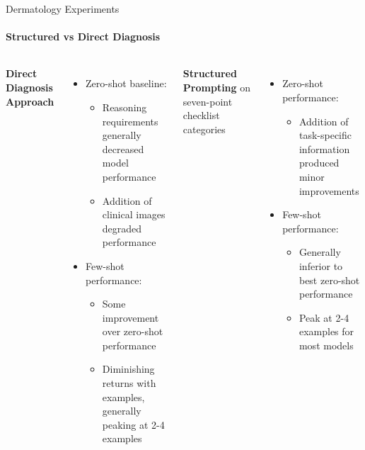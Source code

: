 \begin{frame}{Dermatology Experiments}
\framesubtitle{Structured vs Direct Diagnosis}
  \begin{columns}[T]
    \column{\customcolumnwidth}
      \textbf{Direct Diagnosis Approach}
      \begin{itemize}
        \item Zero-shot baseline:
        \begin{itemize}
          \item Reasoning requirements generally decreased model performance
          \item Addition of clinical images degraded performance
        \end{itemize}
        \item Few-shot performance:
        \begin{itemize}
          \item Some improvement over zero-shot performance
          \item Diminishing returns with examples, generally peaking at 2-4 examples
        \end{itemize}
      \end{itemize}
    \column{\customcolumnwidth}
      \textbf{Structured Prompting} on seven-point checklist categories
      \begin{itemize}
        \item Zero-shot performance:
          \begin{itemize}
            \item Addition of task-specific information produced minor improvements
          \end{itemize}
        \item Few-shot performance:
          \begin{itemize}
            \item Generally inferior to best zero-shot performance
            \item Peak at 2-4 examples for most models
          \end{itemize}
      \end{itemize}
  \end{columns}
\end{frame}
